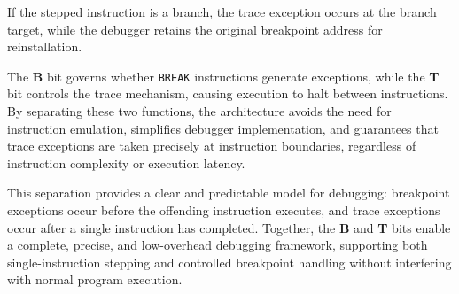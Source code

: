 If the stepped instruction is a branch, the trace exception occurs at the branch target, while the debugger retains the original breakpoint address for reinstallation.


The \textbf{B} bit governs whether \texttt{BREAK} instructions generate exceptions, while the \textbf{T} bit controls the trace mechanism, causing execution to halt between instructions. By separating these two functions, the architecture avoids the need for instruction emulation, simplifies debugger implementation, and guarantees that trace exceptions are taken precisely at instruction boundaries, regardless of instruction complexity or execution latency.

This separation provides a clear and predictable model for debugging: breakpoint exceptions occur before the offending instruction executes, and trace exceptions occur after a single instruction has completed. Together, the \textbf{B} and \textbf{T} bits enable a complete, precise, and low-overhead debugging framework, supporting both single-instruction stepping and controlled breakpoint handling without interfering with normal program execution.
